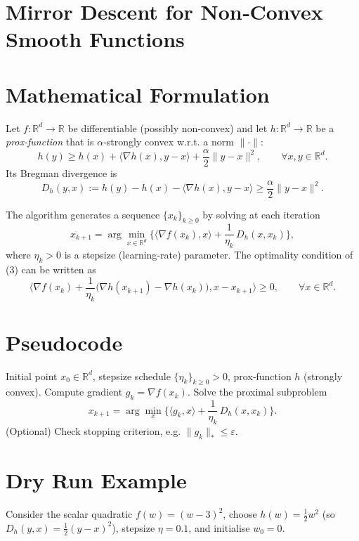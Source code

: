 \documentclass[11pt]{article}
\newcommand{\inner}[2]{\langle #1,#2\rangle}
\newcommand{\grad}{\nabla}
\newcommand{\R}{\mathbb{R}}
\begin{document}
\section*{Mirror Descent for Non‑Convex Smooth Functions}

\section*{Mathematical Formulation}
Let $f:\R^{d}\rightarrow\R$ be differentiable (possibly non‑convex) and let $h:\R^{d}\rightarrow\R$ be a \emph{prox‑function} that is $\alpha$‑strongly convex w.r.t. a norm $\|\cdot\|$:
\[
h(y)\ge h(x)+\inner{\grad h(x)}{y-x}+\frac{\alpha}{2}\|y-x\|^{2},\qquad\forall x,y\in\R^{d}. \tag{1}
\]
Its Bregman divergence is 
\[
D_{h}(y,x):=h(y)-h(x)-\inner{\grad h(x)}{y-x}\ge\frac{\alpha}{2}\|y-x\|^{2}. \tag{2}
\]

The algorithm generates a sequence $\{x_{k}\}_{k\ge0}$ by solving at each iteration
\[
x_{k+1}= \arg\min_{x\in\R^{d}}\Big\{\inner{\grad f(x_{k})}{x}+ \frac{1}{\eta_{k}}\, D_{h}(x,x_{k})\Big\}, \tag{3}
\]
where $\eta_{k}>0$ is a stepsize (learning‑rate) parameter.  
The optimality condition of (3) can be written as
\[
\inner{\grad f(x_{k})+\frac{1}{\eta_{k}}\big(\grad h(x_{k+1})-\grad h(x_{k})\big)}{x-x_{k+1}}\ge0,\qquad\forall x\in\R^{d}. \tag{4}
\]

\section*{Pseudocode}
\begin{algorithm}[H]
\caption{Mirror Descent (MD) for non‑convex smooth $f$}
\begin{algorithmic}[1]
\REQUIRE Initial point $x_{0}\in\R^{d}$, stepsize schedule $\{\eta_{k}\}_{k\ge0}>0$, prox‑function $h$ (strongly convex).
    \STATE Compute gradient $g_{k}= \grad f(x_{k})$.
    \STATE Solve the proximal subproblem
    \[
    x_{k+1}= \arg\min_{x}\Big\{\inner{g_{k}}{x}+ \frac{1}{\eta_{k}}\, D_{h}(x,x_{k})\Big\}.
    \]
    \STATE (Optional) Check stopping criterion, e.g. $\|g_{k}\|_{*}\le\varepsilon$.
\ENDFOR
\end{algorithmic}
\end{algorithm}

\section*{Dry Run Example}
Consider the scalar quadratic $f(w)=(w-3)^{2}$, choose $h(w)=\tfrac12 w^{2}$ (so $D_{h}(y,x)=\tfrac12 (y-x)^{2}$), stepsize $\eta=0.1$, and initialise $w_{0}=0$.
\end{document}
